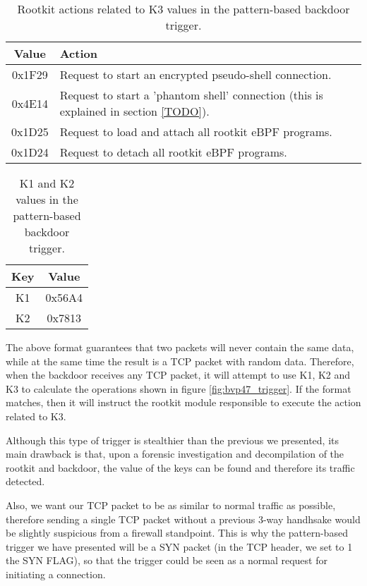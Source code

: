 \begin{table}[htbp]
\begin{tabular}{|c|>{\centering\arraybackslash}p{8cm}|}
\hline
Value & Action\\
\hline
\hline
0x1F29 & Request to start an encrypted pseudo-shell connection.\\
\hline
0x4E14 & Request to start a 'phantom shell' connection (this is explained in section \ref{TODO}).\\
\hline
0x1D25 & Request to load and attach all rootkit eBPF programs.\\
\hline
0x1D24 & Request to detach all rootkit eBPF programs.\\
\hline
\end{tabular}
\caption{Rootkit actions related to K3 values in the pattern-based backdoor trigger.}
\label{table:k3_values}
\end{table}

\begin{table}[htbp]
\begin{tabular}{|c|c|}
\hline
Key & Value\\
\hline
\hline
K1 & 0x56A4\\
\hline
K2 & 0x7813\\
\hline
\end{tabular}
\caption{K1 and K2 values in the pattern-based backdoor trigger.}
\label{table:k1_k2_values}
\end{table}

The above format guarantees that two packets will never contain the same data, while at the same time the result is a TCP packet with random data. Therefore, when the backdoor receives any TCP packet, it will attempt to use K1, K2 and K3 to calculate the operations shown in figure \ref{fig:bvp47_trigger}. If the format matches, then it will instruct the rootkit module responsible to execute the action related to K3.

Although this type of trigger is stealthier than the previous we presented, its main drawback is that, upon a forensic investigation and decompilation of the rootkit and backdoor, the value of the keys can be found and therefore its traffic detected. 

Also, we want our TCP packet to be as similar to normal traffic as possible, therefore sending a single TCP packet without a previous 3-way handhsake would be slightly suspicious from a firewall standpoint. This is why the pattern-based trigger we have presented will be a SYN packet (in the TCP header, we set to 1 the SYN FLAG), so that the trigger could be seen as a normal request for initiating a connection.

